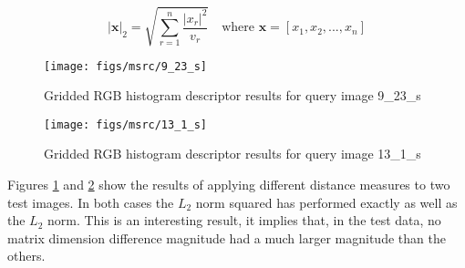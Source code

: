 \begin{appendices}
\begin{equation}
|\mathbf{x}|_2 = \sqrt{\sum_{r=1}^{n} \frac{|x_r|^2}{v_r} } \quad \text{where } \mathbf{x} = [ x_1 , x_2, ... , x_n] \label{eq:mahan-def}
\end{equation}

\begin{figure}[ht]
	\begin{minipage}[]{0.3\linewidth}
		\centering
		\texttt{[image: figs/msrc/9\_23\_s]}
	\end{minipage}
	\begin{minipage}[]{0.7\linewidth}
		\centering
		\prplotclose
	\end{minipage}
	\caption{Gridded RGB histogram descriptor results for query image 9\_23\_s}
	\label{fig:dist-meas-sheep}
\end{figure}

\begin{figure}[ht]
	\begin{minipage}[]{0.3\linewidth}
		\centering
		\texttt{[image: figs/msrc/13\_1\_s]}
	\end{minipage}
	\begin{minipage}[]{0.7\linewidth}
		\centering
		\prplotclose
	\end{minipage}
	\caption{Gridded RGB histogram descriptor results for query image 13\_1\_s}
	\label{fig:dist-meas-books}
\end{figure}

Figures \ref{fig:dist-meas-sheep} and \ref{fig:dist-meas-books} show the results of applying different distance measures to two test images. In both cases the $L_2$ norm squared has performed exactly as well as the $L_2$ norm. This is an interesting result, it implies that, in the test data, no matrix dimension difference magnitude had a much larger magnitude than the others.


\end{appendices}
